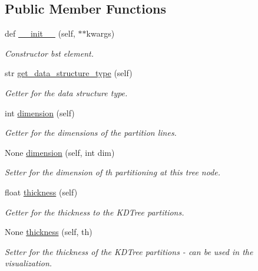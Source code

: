\subsection*{Public Member Functions}
\begin{DoxyCompactItemize}
\item 
def \mbox{\hyperlink{classbridges_1_1kd__tree__element_1_1_k_d_tree_element_ad48f0bdabbb21cf83782efc1f8dbc1ed}{\+\_\+\+\_\+init\+\_\+\+\_\+}} (self, $\ast$$\ast$kwargs)
\begin{DoxyCompactList}\small\item\em Constructor bst element. \end{DoxyCompactList}\item 
str \mbox{\hyperlink{classbridges_1_1kd__tree__element_1_1_k_d_tree_element_a4b38af960542ccc8c3b74d90ee9570e2}{get\+\_\+data\+\_\+structure\+\_\+type}} (self)
\begin{DoxyCompactList}\small\item\em Getter for the data structure type. \end{DoxyCompactList}\item 
int \mbox{\hyperlink{classbridges_1_1kd__tree__element_1_1_k_d_tree_element_a2f600f754650ce8ea08954b969a5dae8}{dimension}} (self)
\begin{DoxyCompactList}\small\item\em Getter for the dimensions of the partition lines. \end{DoxyCompactList}\item 
None \mbox{\hyperlink{classbridges_1_1kd__tree__element_1_1_k_d_tree_element_a23ec48bd5d7949a2b1e62794344c87f9}{dimension}} (self, int dim)
\begin{DoxyCompactList}\small\item\em Setter for the dimension of th partitioning at this tree node. \end{DoxyCompactList}\item 
float \mbox{\hyperlink{classbridges_1_1kd__tree__element_1_1_k_d_tree_element_a936e2b664181ddc85e11a1c1057b3dab}{thickness}} (self)
\begin{DoxyCompactList}\small\item\em Getter for the thickness to the K\+D\+Tree partitions. \end{DoxyCompactList}\item 
None \mbox{\hyperlink{classbridges_1_1kd__tree__element_1_1_k_d_tree_element_ae78db83d6d61169f7afc9c8c4efcb87a}{thickness}} (self, th)
\begin{DoxyCompactList}\small\item\em Setter for the thickness of the K\+D\+Tree partitions -\/ can be used in the visualization. \end{DoxyCompactList}\item 
$$
\end{DoxyCompactItemize}
